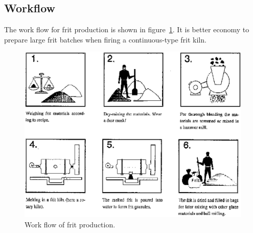 \subsection{Workflow}
The work flow for frit production is shown in figure~\ref{fig:fritworkflow}. It 
is better economy to prepare large frit batches when firing a continuous-type 
frit kiln.
\begin{figure}[htbp!]
  \centering
  \includegraphics[width=0.8\linewidth]{img/fritworkflow.eps}
  \caption{Work flow of frit production.}
  \label{fig:fritworkflow}
\end{figure}
